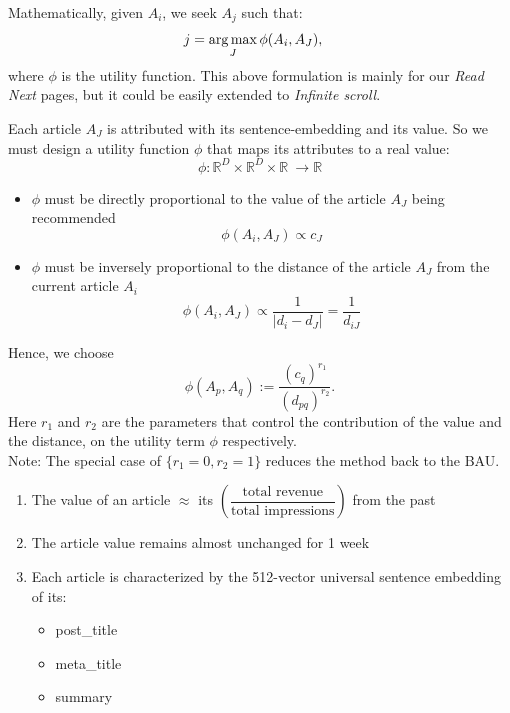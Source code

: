 \documentclass[11]{article}
\begin{document}
Mathematically, given $A_i$, we seek $A_j$ such that:
\begin{align*}
 j&= \operatorname*{arg\,max}_J   \phi(A_i, A_{J}) ,
\end{align*}
where $\phi$ is the utility function. This above formulation is mainly for our \textit{Read Next} pages, but it could be easily extended to \textit{Infinite scroll}.


Each article $A_J$ is attributed with its sentence-embedding and its value. So we must design a utility function $\phi$ that maps its attributes to a real value:
\[ \phi: \mathbb{R}^D\times\mathbb{R}^D\times\mathbb{R}\ \to \mathbb{R} \]

\begin{itemize}
\item $\phi$ must be directly proportional to the  value of the article $A_J$ being recommended \[ \phi(A_i, A_{J})  \propto c_J \]
\item $\phi$ must be inversely proportional to the  distance of the article $A_J$ from the current article $A_i$ \[ \phi(A_i, A_{J})  \propto \frac{1}{|d_i-d_J|} =\frac{1}{d_{iJ}} \]
\end{itemize}

Hence, we choose $$\phi(A_p, A_{q}):=\dfrac{(c_{q})^{r_1}}{(d_{pq})^{r_2}}.$$ Here $r_1$ and $r_2$ are the parameters that control the contribution of the value and the distance, on the utility term $\phi$ respectively. \\Note: The special case of $\{r_1=0, r_2=1 \}$ reduces the method back to the BAU.
\vspace{0.3cm}

\begin{enumerate}
\item The value of an article $\approx$ its $\left(\dfrac{\text{total revenue}}{\text{total impressions}} \right)$  from the past
\item The article value remains almost unchanged for 1 week
\item Each article is characterized by the 512-vector universal sentence embedding of its: 
\begin{itemize}
\item post\_title
\item meta\_title
\item summary
\end{itemize}


\end{enumerate}
\end{document}
